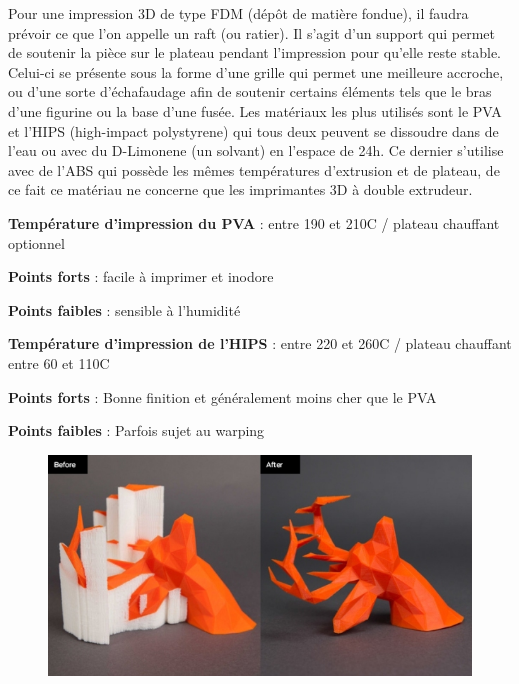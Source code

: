 \documentclass{article}
\begin{document}
Pour une impression 3D de type FDM (dépôt de matière fondue), il faudra prévoir ce que l'on appelle un raft (ou ratier). Il s'agit d'un support qui permet de soutenir la pièce sur le plateau pendant l'impression pour qu'elle reste stable. Celui-ci se présente sous la forme d'une grille qui permet une meilleure accroche, ou d'une sorte d'échafaudage afin de soutenir certains éléments tels que le bras d'une figurine ou la base d'une fusée. Les matériaux les plus utilisés sont le PVA et l'HIPS (high-impact polystyrene) qui tous deux peuvent se dissoudre dans de l'eau ou avec du D-Limonene (un solvant) en l'espace de 24h. Ce dernier s'utilise avec de l'ABS qui possède les mêmes températures d'extrusion et de plateau, de ce fait ce matériau ne concerne que les imprimantes 3D à double extrudeur.\hfill
 \par\leavevmode\par
\textbf{Température d'impression du PVA} : entre 190 et 210\degres C / plateau chauffant optionnel\hfill

\textbf{Points forts} : facile à imprimer et inodore\hfill

\textbf{Points faibles} : sensible à l'humidité\hfill 

\textbf{Température d'impression de l'HIPS} : entre 220 et 260\degres C / plateau chauffant entre 60 et 110\degres C\hfill 

\textbf{Points forts} : Bonne finition et généralement moins cher que le PVA\hfill

\textbf{Points faibles} : Parfois sujet au warping\hfill 
 \par\leavevmode\par
{}

\begin{figure}[h!]
\centering
\includegraphics[scale=0.4]{./images/raft-cerf.png}
\end{figure}\hfill
\newpage
\end{document}
